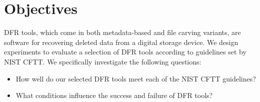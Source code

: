 \section{Objectives} \label{rqs}

DFR tools, which come in both metadata-based and file carving variants, are software for recovering deleted data from a digital storage device.
We design experiments to evaluate a selection of DFR tools according to guidelines set by NIST CFTT.
We specifically investigate the following questions:

\begin{itemize}
\item How well do our selected DFR tools meet each of the NIST CFTT guidelines?
\item What conditions influence the success and failure of DFR tools?
\end{itemize}


 
